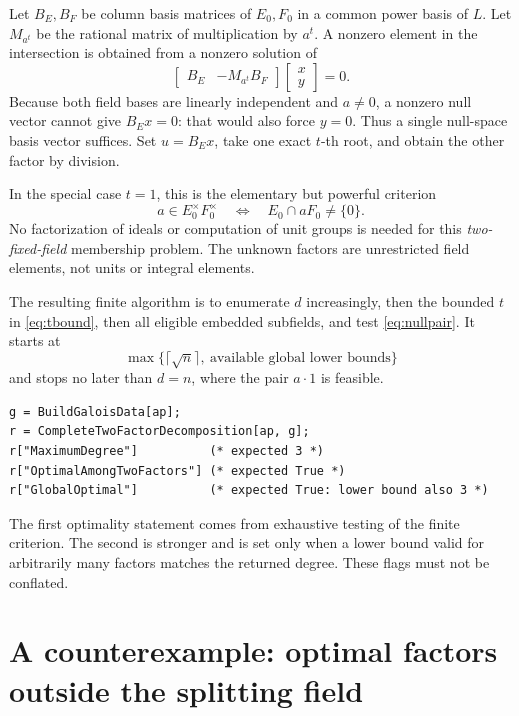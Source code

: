 \documentclass[11pt,a4paper]{article}
\theoremstyle{definition}\newtheorem{definition}[theorem]{Definition}
\theoremstyle{remark}\newtheorem{remark}[theorem]{Remark}
\begin{document}
Let $B_E,B_F$ be column basis matrices of $E_0,F_0$ in a common power
basis of $L$. Let $M_{a^t}$ be the rational matrix of multiplication by
$a^t$. A nonzero element in the intersection is obtained from a nonzero
solution of
\begin{equation}
 \begin{bmatrix}B_E&-M_{a^t}B_F\end{bmatrix}
 \begin{bmatrix}x\\y\end{bmatrix}=0.
 \label{eq:nullpair}
\end{equation}
Because both field bases are linearly independent and $a\ne0$, a nonzero
null vector cannot give $B_Ex=0$: that would also force $y=0$. Thus a single
null-space basis vector suffices. Set $u=B_Ex$, take one exact $t$-th root,
and obtain the other factor by division.

In the special case $t=1$, this is the elementary but powerful criterion
\[
 a\in E_0^{\times}F_0^{\times}
 \quad\Longleftrightarrow\quad E_0\cap aF_0\ne\{0\}.
\]
No factorization of ideals or computation of unit groups is needed for this
\emph{two-fixed-field} membership problem. The unknown factors are
unrestricted field elements, not units or integral elements.

The resulting finite algorithm is to enumerate $d$ increasingly, then the
bounded $t$ in \eqref{eq:tbound}, then all eligible embedded subfields,
and test \eqref{eq:nullpair}. It starts at
\[
 \max\{\lceil\sqrt n\rceil,\ \text{available global lower bounds}\}
\]
and stops no later than $d=n$, where the pair $a\cdot1$ is feasible.

\begin{lstlisting}
g = BuildGaloisData[ap];
r = CompleteTwoFactorDecomposition[ap, g];
r["MaximumDegree"]          (* expected 3 *)
r["OptimalAmongTwoFactors"] (* expected True *)
r["GlobalOptimal"]          (* expected True: lower bound also 3 *)
\end{lstlisting}
The first optimality statement comes from exhaustive testing of the finite
criterion. The second is stronger and is set only when a lower bound valid
for arbitrarily many factors matches the returned degree. These flags must
not be conflated.

\section{A counterexample: optimal factors outside the splitting field}
\label{sec:external}
\end{document}
